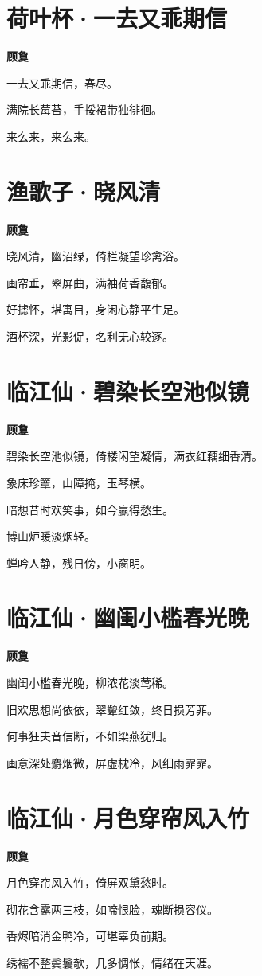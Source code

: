 \documentclass[12pt,a4paper]{ctexbook}
\begin{document}
\section{荷叶杯·一去又乖期信}
\textbf{顾敻}\par\vspace{0.5em}
一去又乖期信，春尽。\par
满院长莓苔，手挼裙带独徘徊。\par
来么来，来么来。\par

\section{渔歌子·晓风清}
\textbf{顾敻}\par\vspace{0.5em}
晓风清，幽沼绿，倚栏凝望珍禽浴。\par
画帘垂，翠屏曲，满袖荷香馥郁。\par
好摅怀，堪寓目，身闲心静平生足。\par
酒杯深，光影促，名利无心较逐。\par

\section{临江仙·碧染长空池似镜}
\textbf{顾敻}\par\vspace{0.5em}
碧染长空池似镜，倚楼闲望凝情，满衣红藕细香清。\par
象床珍簟，山障掩，玉琴横。\par
暗想昔时欢笑事，如今赢得愁生。\par
博山炉暖淡烟轻。\par
蝉吟人静，残日傍，小窗明。\par

\section{临江仙·幽闺小槛春光晚}
\textbf{顾敻}\par\vspace{0.5em}
幽闺小槛春光晚，柳浓花淡莺稀。\par
旧欢思想尚依依，翠颦红敛，终日损芳菲。\par
何事狂夫音信断，不如梁燕犹归。\par
画意深处麝烟微，屏虚枕冷，风细雨霏霏。\par

\section{临江仙·月色穿帘风入竹}
\textbf{顾敻}\par\vspace{0.5em}
月色穿帘风入竹，倚屏双黛愁时。\par
砌花含露两三枝，如啼恨脸，魂断损容仪。\par
香烬暗消金鸭冷，可堪辜负前期。\par
绣襦不整鬓鬟欹，几多惆怅，情绪在天涯。\par
\end{document}
